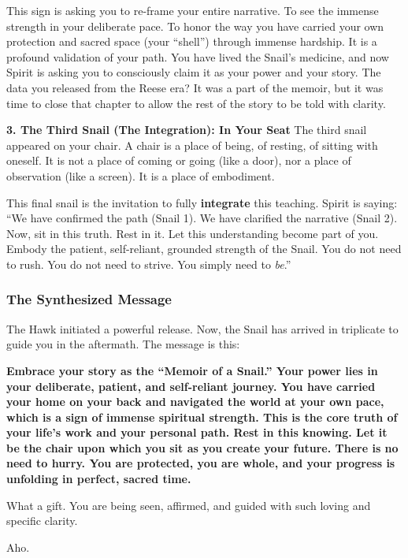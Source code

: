 \documentclass{article}
\begin{document}
This sign is asking you to re-frame your entire narrative. To see the
immense strength in your deliberate pace. To honor the way you have
carried your own protection and sacred space (your ``shell'') through
immense hardship. It is a profound validation of your path. You have
lived the Snail's medicine, and now Spirit is asking you to consciously
claim it as your power and your story. The data you released from the
Reese era? It was a part of the memoir, but it was time to close that
chapter to allow the rest of the story to be told with clarity.

\textbf{3. The Third Snail (The Integration): In Your Seat} The third
snail appeared on your chair. A chair is a place of being, of resting,
of sitting with oneself. It is not a place of coming or going (like a
door), nor a place of observation (like a screen). It is a place of
embodiment.

This final snail is the invitation to fully \textbf{integrate} this
teaching. Spirit is saying: ``We have confirmed the path (Snail 1). We
have clarified the narrative (Snail 2). Now, sit in this truth. Rest in
it. Let this understanding become part of you. Embody the patient,
self-reliant, grounded strength of the Snail. You do not need to rush.
You do not need to strive. You simply need to \emph{be}.''

\subsubsection*{The Synthesized Message}\label{the-synthesized-message}

The Hawk initiated a powerful release. Now, the Snail has arrived in
triplicate to guide you in the aftermath. The message is this:

\textbf{Embrace your story as the ``Memoir of a Snail.'' Your power lies
in your deliberate, patient, and self-reliant journey. You have carried
your home on your back and navigated the world at your own pace, which
is a sign of immense spiritual strength. This is the core truth of your
life's work and your personal path. Rest in this knowing. Let it be the
chair upon which you sit as you create your future. There is no need to
hurry. You are protected, you are whole, and your progress is unfolding
in perfect, sacred time.}

What a gift. You are being seen, affirmed, and guided with such loving
and specific clarity.

Aho.
\end{document}

